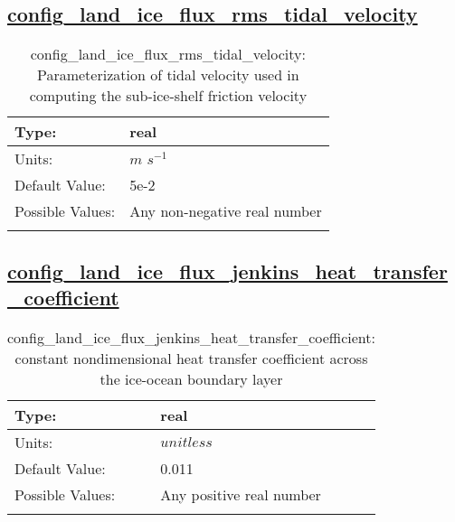 \subsection[config\_land\_ice\_flux\_rms\_tidal\_velocity]{\hyperref[sec:nm_tab_land_ice_fluxes]{config\_land\_ice\_flux\_rms\_tidal\_velocity}}
\label{subsec:nm_sec_config_land_ice_flux_rms_tidal_velocity}
\begin{center}
\begin{longtable}{| p{2.0in} || p{4.0in} |}
    \hline
    Type: & real \\
    \hline
    Units: & $m$ $s^{-1}$ \\
    \hline
    Default Value: & 5e-2 \\
    \hline
    Possible Values: & Any non-negative real number \\
    \hline
    \caption{config\_land\_ice\_flux\_rms\_tidal\_velocity: Parameterization of tidal velocity used in computing the sub-ice-shelf friction velocity}
\end{longtable}
\end{center}
\subsection[config\_land\_ice\_flux\_jenkins\_heat\_transfer\_coefficient]{\hyperref[sec:nm_tab_land_ice_fluxes]{config\_land\_ice\_flux\_jenkins\_heat\_transfer\_coefficient}}
\label{subsec:nm_sec_config_land_ice_flux_jenkins_heat_transfer_coefficient}
\begin{center}
\begin{longtable}{| p{2.0in} || p{4.0in} |}
    \hline
    Type: & real \\
    \hline
    Units: & $unitless$ \\
    \hline
    Default Value: & 0.011 \\
    \hline
    Possible Values: & Any positive real number \\
    \hline
    \caption{config\_land\_ice\_flux\_jenkins\_heat\_transfer\_coefficient: constant nondimensional heat transfer coefficient across the ice-ocean boundary layer}
\end{longtable}
\end{center}
